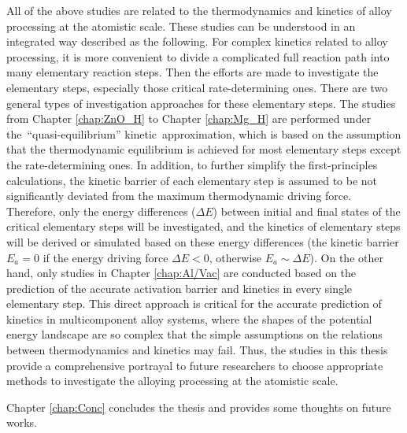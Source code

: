 All of the above studies are related to the thermodynamics and kinetics of alloy processing at the atomistic scale. These studies can be understood in an integrated way described as the following. For complex kinetics related to alloy processing, it is more convenient to divide a complicated full reaction path into many elementary reaction steps. Then the efforts are made to investigate the elementary steps, especially those critical rate-determining ones. There are two general types of investigation approaches for these elementary steps. The studies from Chapter \ref{chap:ZnO_H} to Chapter \ref{chap:Mg_H} are performed under the ``quasi-equilibrium'' kinetic approximation, which is based on the assumption that the thermodynamic equilibrium is achieved for most elementary steps except the rate-determining ones. In addition, to further simplify the first-principles calculations, the kinetic barrier of each elementary step is assumed to be not significantly deviated from the maximum thermodynamic driving force. Therefore, only the energy differences ($\Delta E$) between initial and final states of the critical elementary steps will be investigated, and the kinetics of elementary steps will be derived or simulated based on these energy differences (the kinetic barrier $E_a = 0$ if the energy driving force $\Delta E < 0$, otherwise $E_a \sim \Delta E$). On the other hand, only studies in Chapter \ref{chap:Al/Vac} are conducted based on the prediction of the accurate activation barrier and kinetics in every single elementary step. This direct approach is critical for the accurate prediction of kinetics in multicomponent alloy systems, where the shapes of the potential energy landscape are so complex that the simple assumptions on the relations between thermodynamics and kinetics may fail.  Thus, the studies in this thesis provide a comprehensive portrayal to future researchers to choose appropriate methods to investigate the alloying processing at the atomistic scale.

Chapter \ref{chap:Conc} concludes the thesis and provides some thoughts on future works.